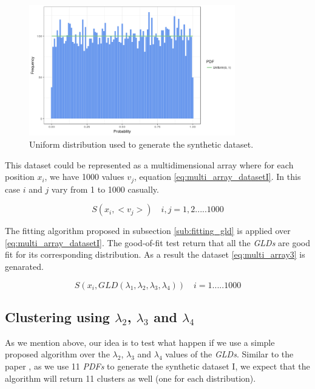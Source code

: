 \begin{figure}[ht]
    \centering
    \includegraphics[width=0.8\textwidth]{img/gld_clustering/extra_images/uniform.png}
    \caption{Uniform distribution used to generate the synthetic dataset.}
    \label{fig:uniform}
\end{figure}

This dataset could be represented as a multidimensional array where for each position $x_{i}$, we have 1000 values $v_{j}$, equation \ref{eq:multi_array_datasetI}. In this case $i$ and $j$ vary from 1 to 1000 casually.

\begin{equation}\label{eq:multi_array_datasetI}
S(x_{i}, <v_{j}>) \quad i,j=1, 2.....1000
\end{equation}

The fitting algorithm proposed in subsection \ref{sub:fitting_gld} is applied over \ref{eq:multi_array_datasetI}. The good-of-fit test return that all the \textit{GLDs} are good fit for its corresponding distribution. As a result the dataset \ref{eq:multi_array3} is genarated. 

\begin{equation}\label{eq:multi_array3}
S(x_{i}, GLD(\lambda_{1},\lambda_{2},\lambda_{3},\lambda_{4})) \quad i=1.....1000
\end{equation}

\subsection{Clustering using $\lambda_{2}$, $\lambda_{3}$ and $\lambda_{4}$}\label{syntheticI_l234}

As we mention above, our idea is to test what happen if we use a simple proposed algorithm over the $\lambda_{2}$, $\lambda_{3}$ and $\lambda_{4}$ values of the \textit{GLDs}. Similar to the paper \cite{Jiang2011}, as we use 11 \textit{PDFs} to generate the synthetic dataset I, we expect that the algorithm will return 11 clusters as well (one for each distribution).


